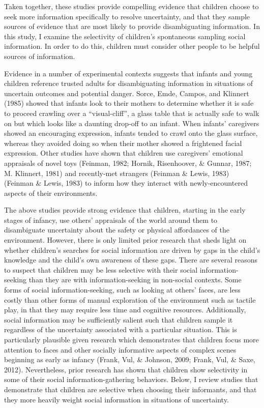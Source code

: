 \documentclass[floatsintext,man]{apa6}
\theoremstyle{definition}
\theoremstyle{definition}
\theoremstyle{definition}
\theoremstyle{remark}
\begin{document}
Taken together, these studies provide compelling evidence that children
choose to seek more information specifically to resolve uncertainty, and
that they sample sources of evidence that are most likely to provide
disambiguating information. In this study, I examine the selectivity of
children's spontaneous sampling social information. In order to do this,
children must consider other people to be helpful sources of
information.

Evidence in a number of experimental contexts suggests that infants and
young children reference trusted adults for disambiguating information
in situations of uncertain outcomes and potential danger. Sorce, Emde,
Campos, and Klinnert (1985) showed that infants look to their mothers to
determine whether it is safe to proceed crawling over a
\enquote{visual-cliff}, a glass table that is actually safe to walk on
but which looks like a daunting drop-off to an infant. When infants'
caregivers showed an encouraging expression, infants tended to crawl
onto the glass surface, whereas they avoided doing so when their mother
showed a frightened facial expression. Other studies have shown that
children use caregivers' emotional appraisals of novel toys (Feinman,
1982; Hornik, Risenhoover, \& Gunnar, 1987; M. Klinnert, 1981) and
recently-met strangers (Feinman \& Lewis, 1983) (Feinman \& Lewis, 1983)
to inform how they interact with newly-encountered aspects of their
environments.

The above studies provide strong evidence that children, starting in the
early stages of infancy, use others' appraisals of the world around them
to disambiguate uncertainty about the safety or physical affordances of
the environment. However, there is only limited prior research that
sheds light on whether children's searches for social information are
driven by gaps in the child's knowledge and the child's own awareness of
these gaps. There are several reasons to suspect that children may be
less selective with their social information-seeking than they are with
information-seeking in non-social contexts. Some forms of social
information-seeking, such as looking at others' faces, are less costly
than other forms of manual exploration of the environment such as
tactile play, in that they may require less time and cognitive
resources. Additionally, social information may be sufficiently salient
such that children sample it regardless of the uncertainty associated
with a particular situation. This is particularly plausible given
research which demonstrates that children focus more attention to faces
and other socially informative aspects of complex scenes beginning as
early as infancy (Frank, Vul, \& Johnson, 2009; Frank, Vul, \& Saxe,
2012). Nevertheless, prior research has shown that children show
selectivity in some of their social information-gathering behaviors.
Below, I review studies that demonstrate that children are selective
when choosing their informants, and that they more heavily weight social
information in situations of uncertainty.
\end{document}
